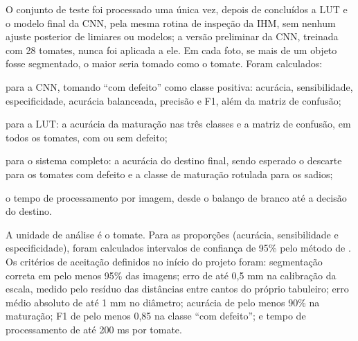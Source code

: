 O conjunto de teste foi processado uma única vez, depois de concluídos a LUT e o modelo final da CNN, pela mesma rotina de inspeção da IHM, sem nenhum ajuste posterior de limiares ou modelos; a versão preliminar da CNN, treinada com 28 tomates, nunca foi aplicada a ele. Em cada foto, se mais de um objeto fosse segmentado, o maior seria tomado como o tomate. Foram calculados:

\begin{alineas}
	\item para a CNN, tomando ``com defeito'' como classe positiva: acurácia, sensibilidade, especificidade, acurácia balanceada, precisão e F1, além da matriz de confusão;
	\item para a LUT: a acurácia da maturação nas três classes e a matriz de confusão, em todos os tomates, com ou sem defeito;
	\item para o sistema completo: a acurácia do destino final, sendo esperado o descarte para os tomates com defeito e a classe de maturação rotulada para os sadios;
	\item o tempo de processamento por imagem, desde o balanço de branco até a decisão do destino.
\end{alineas}

A unidade de análise é o tomate. Para as proporções (acurácia, sensibilidade e especificidade), foram calculados intervalos de confiança de 95\% pelo método de \textcite{wilson1927}. Os critérios de aceitação definidos no início do projeto foram: segmentação correta em pelo menos 95\% das imagens; erro de até 0,5 mm na calibração da escala, medido pelo resíduo das distâncias entre cantos do próprio tabuleiro; erro médio absoluto de até 1 mm no diâmetro; acurácia de pelo menos 90\% na maturação; F1 de pelo menos 0,85 na classe ``com defeito''; e tempo de processamento de até 200 ms por tomate.
